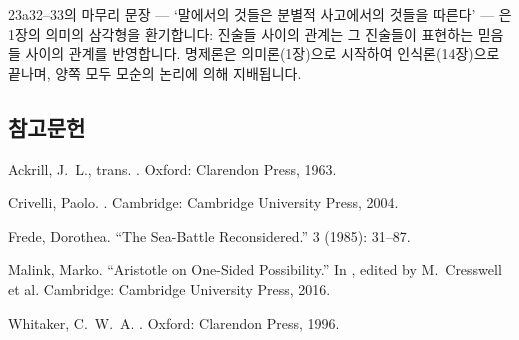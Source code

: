 \documentclass[12pt, a4paper]{article}
\begin{document}
23a32--33의 마무리 문장 --- `말에서의 것들은 분별적 사고에서의 것들을 따른다' --- 은 1장의 의미의 삼각형을 환기합니다: 진술들 사이의 관계는 그 진술들이 표현하는 믿음들 사이의 관계를 반영합니다. 명제론은 의미론(1장)으로 시작하여 인식론(14장)으로 끝나며, 양쪽 모두 모순의 논리에 의해 지배됩니다.

\subsection*{참고문헌}
\begin{references}

 Ackrill, J.\ L., trans. . Oxford: Clarendon Press, 1963.

 Crivelli, Paolo. . Cambridge: Cambridge University Press, 2004.

 Frede, Dorothea. ``The Sea-Battle Reconsidered.''  3 (1985): 31--87.

 Malink, Marko. ``Aristotle on One-Sided Possibility.'' In , edited by M.\ Cresswell et al. Cambridge: Cambridge University Press, 2016.

 Whitaker, C.\ W.\ A. . Oxford: Clarendon Press, 1996.

\end{references}
\end{document}
